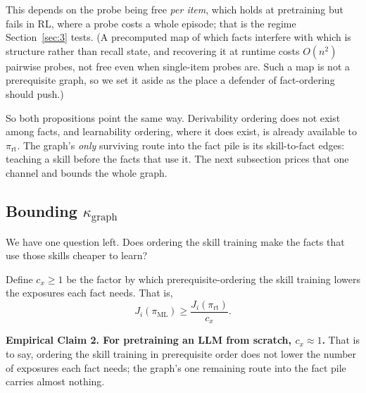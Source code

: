 \documentclass[11pt]{article}
\theoremstyle{plain}
\theoremstyle{definition}
\theoremstyle{remark}
\begin{document}
This depends on the probe being free \emph{per item}, which holds at pretraining but fails in RL,
where a probe costs a whole episode; that is the regime Section~\ref{sec:3} tests. (A precomputed
map of which facts interfere with which is structure rather than recall state, and recovering it at
runtime costs $O(n^2)$ pairwise probes, not free even when single-item probes are. Such a map is not
a prerequisite graph, so we set it aside as the place a defender of fact-ordering should push.)

So both propositions point the same way. Derivability ordering does not exist among facts, and
learnability ordering, where it does exist, is already available to $\pi_{\mathrm{rt}}$. The graph's
\emph{only} surviving route into the fact pile is its skill-to-fact edges: teaching a skill before
the facts that use it. The next subsection prices that one channel and bounds the whole graph.



\subsection{Bounding $\kappa_\text{graph}$}
\label{sec:cross}

We have one question left. Does ordering the skill training make the facts that use those skills cheaper to learn?

\label{asm:cross}%
Define $c_x\ge1$ be the factor by which prerequisite-ordering the skill training lowers the exposures each fact needs. That is,
\begin{equation*}
J_i(\pi_{\mathrm{ML}})\ge \frac{J_i(\pi_{\mathrm{rt}})}{c_x}.
\end{equation*}

%
\textbf{Empirical Claim 2. For pretraining an LLM from scratch, $c_x \approx 1$.}\label{prem:cx}
That is to say, ordering the skill training in prerequisite order does not lower the number of
exposures each fact needs; the graph's one remaining route into the fact pile carries almost
nothing.
\end{document}
